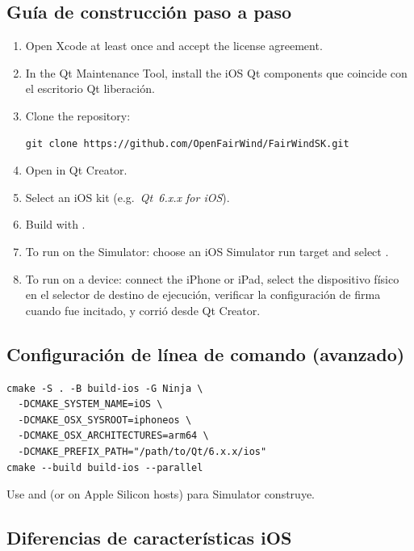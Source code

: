 \subsection{Guía de construcción paso a paso}

\begin{enumerate}
  \item Open Xcode at least once and accept the license agreement.
  \item In the Qt Maintenance Tool, install the iOS Qt components
que coincide con el escritorio Qt liberación.
  \item Clone the repository:
\begin{lstlisting}
git clone https://github.com/OpenFairWind/FairWindSK.git
\end{lstlisting}
  \item Open  in Qt Creator.
  \item Select an iOS kit (e.g.\ \textit{Qt~6.x.x for iOS}).
  \item Build with .
  \item To run on the Simulator: choose an iOS Simulator run target
        and select .
  \item To run on a device: connect the iPhone or iPad, select the
dispositivo físico en el selector de destino de ejecución, verificar la configuración de firma
cuando fue incitado, y corrió desde Qt Creator.
\end{enumerate}

\subsection{Configuración de línea de comando (avanzado)}

\begin{lstlisting}
cmake -S . -B build-ios -G Ninja \
  -DCMAKE_SYSTEM_NAME=iOS \
  -DCMAKE_OSX_SYSROOT=iphoneos \
  -DCMAKE_OSX_ARCHITECTURES=arm64 \
  -DCMAKE_PREFIX_PATH="/path/to/Qt/6.x.x/ios"
cmake --build build-ios --parallel
\end{lstlisting}

Use \code{iphonesimulator} and \code{x86\_64} (or  on
Apple Silicon hosts) para Simulator construye.

\subsection{Diferencias de características iOS}

